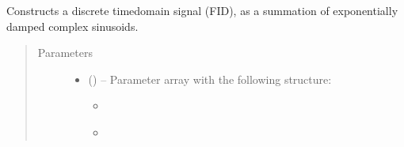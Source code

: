 \documentclass[letterpaper,10pt,english]{sphinxmanual}
\begin{document}
\begin{fulllineitems}
\label{\detokenize{references/sig:nmrespy.sig.make_fid}}
\sphinxAtStartPar
Constructs a discrete time\sphinxhyphen{}domain signal (FID), as a summation of
exponentially damped complex sinusoids.
\begin{quote}\begin{description}
\item[{Parameters}] \leavevmode\begin{itemize}
\item {} 
\sphinxAtStartPar
{} () – 
\sphinxAtStartPar
Parameter array with the following structure:
\begin{itemize}
\item {} 
\sphinxAtStartPar
{}

\begin{sphinxVerbatim}[commandchars=\\\{\}]
  \PYG{p}{[}
   \PYG{p}{[}   \PYG{p}{]}
   \PYG{p}{[}   \PYG{p}{]}
   \PYG{p}{[}   \PYG{p}{]}
\PYG{p}{]}
\end{sphinxVerbatim}

\item {} 
\sphinxAtStartPar
{}


\end{itemize}
\end{itemize}
\end{description}
\end{quote}
\end{fulllineitems}
\end{document}
